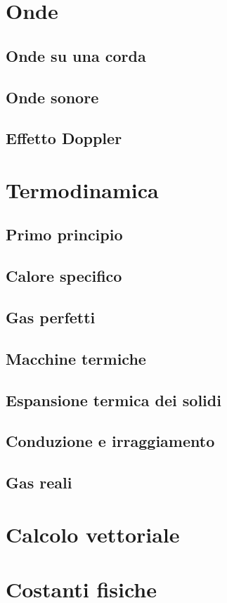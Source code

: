 \documentclass[70pt]{article}
\begin{document}
\begin{small}
\begin{multicols}{3}
\section{Onde}
	\subsection{Onde su una corda}
	\subsection{Onde sonore}
	\subsection{Effetto Doppler}
\section{Termodinamica}
	\subsection{Primo principio}
	\subsection{Calore specifico}
	\subsection{Gas perfetti}
	\subsection{Macchine termiche}
	\subsection{Espansione termica dei solidi}
	\subsection{Conduzione e irraggiamento}
	\subsection{Gas reali}
\section{Calcolo vettoriale}
\section{Costanti fisiche}

\end{multicols}
\end{small}
\end{document}
